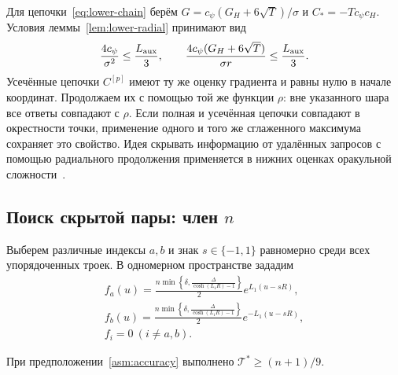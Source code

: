 Для цепочки~\eqref{eq:lower-chain} берём
$G=c_\psi(G_H+6\sqrt T)/\sigma$ и $C_\ast=-Tc_\psi c_H$.
Условия леммы~\ref{lem:lower-radial} принимают вид
\begin{equation}\label{eq:lower-mask-conditions}
 \frac{4c_\psi}{\sigma^2}\le\frac{L_{\rm aux}}3,
 \qquad \frac{4c_\psi(G_H+6\sqrt T)}{\sigma r}\le\frac{L_{\rm aux}}3.
\end{equation}
Усечённые цепочки $C^{[p]}$ имеют ту же оценку градиента
и равны нулю в начале координат. Продолжаем их с помощью
той же функции $\rho$: вне указанного шара все ответы совпадают с $\rho$.
Если полная и усечённая цепочки совпадают в окрестности точки,
применение одного и того же сглаженного максимума сохраняет это свойство.
Идея скрывать информацию от удалённых запросов с помощью радиального
продолжения применяется в нижних оценках оракульной сложности~\citep{carmon2020lower}.

\subsection{Поиск скрытой пары: член \texorpdfstring{$n$}{n}}

Выберем различные индексы $a,b$ и знак $s\in\{-1,1\}$
равномерно среди всех упорядоченных троек. В одномерном пространстве зададим
\[
 \begin{gathered}
 f_a(u)=\frac{n\min\left\{\delta,\frac\Delta{\cosh(L_1R)-1}\right\}}{2}e^{L_1(u-sR)},\\
 f_b(u)=\frac{n\min\left\{\delta,\frac\Delta{\cosh(L_1R)-1}\right\}}{2}e^{-L_1(u-sR)},\\
 f_i=0\ (i\ne a,b).
 \end{gathered}
\]


\begin{lemma}\label{lem:lower-pair}
При предположении~\ref{asm:accuracy} выполнено
$\mathcal T^\ast\ge(n+1)/9$.
\end{lemma}

